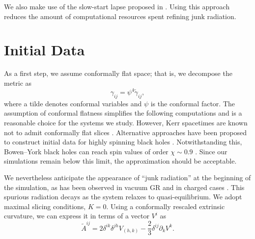 
We also make use of the slow-start lapse proposed in \cite{Etienne2024}. Using this approach reduces the amount of computational resources spent refining junk radiation. 

\section{Initial Data}
\label{sec:appx:id}

As a first step, we assume conformally flat space; that is, we decompose the metric as
\begin{equation}
    \gamma_{ij}= \psi^4 \tilde{\gamma}_{ij},
\end{equation}
where a tilde denotes conformal variables and $\psi$ is the conformal factor. The assumption of conformal flatness simplifies the following computations and is a reasonable choice for the systems we study. However, Kerr spacetimes are known not to admit conformally flat slices \cite{ValienteKroon2004,Price2000}. Alternative approaches have been proposed to construct initial data for highly spinning black holes \cite{Lousto2012}. Notwithstanding this, Bowen--York black holes can reach spin values of order $\chi \sim 0.9$ \cite{Dain2002}. Since our simulations remain below this limit, the approximation should be acceptable.  

We nevertheless anticipate the appearance of ``junk radiation'' at the beginning of the simulation, as has been observed in vacuum GR \cite{Gleiser1998} and in charged cases \cite{Bozzola2021}. This spurious radiation decays as the system relaxes to quasi-equilibrium. We adopt maximal slicing conditions, $K=0$. Using a conformally rescaled extrinsic curvature, we can express it in terms of a vector $V^i$ as
\begin{equation}
    \tilde{A}^{ij} = 2 \delta^{ik}\delta^{jh}V_{(h,k)} - \frac{2}{3}\delta^{ij}\partial_k V^k.
\end{equation} 

